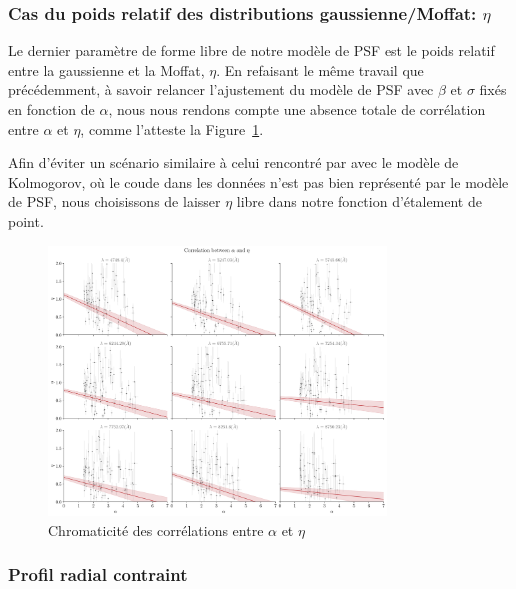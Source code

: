\documentclass[../main/main.tex]{subfiles}
\begin{document}

\subsubsection{Cas du poids relatif des distributions gaussienne/Moffat:
$\eta$}

Le dernier paramètre de forme libre de notre modèle de PSF est le poids
relatif entre la gaussienne et la Moffat, $\eta$. En refaisant le même
travail que précédemment, à savoir relancer l'ajustement du modèle de
PSF avec $\beta$ et $\sigma$ fixés en fonction de $\alpha$, nous nous
rendons compte une absence totale de corrélation entre $\alpha$ et
$\eta$, comme l'atteste la Figure~\ref{fig:alphaetachromcorr}.

Afin d'éviter un scénario similaire à celui rencontré par
\citet{Butonthese} avec le modèle de Kolmogorov, où le coude dans les données n'est pas
bien représenté par le modèle de PSF, nous choisissons de laisser $\eta$
libre dans notre fonction d'étalement de point.

\begin{figure}[ht]
  \centering
  \includegraphics[width=0.8\textwidth]{../figures/06_irf/STD_alpha_eta_chromatic_corr.pdf}
  \caption[Chromaticité des corrélations entre $\alpha$ et $\eta$]{Chromaticité des corrélations entre $\alpha$ et $\eta$}
  \label{fig:alphaetachromcorr}
\end{figure}

\subsubsection{Profil radial contraint}
\end{document}
